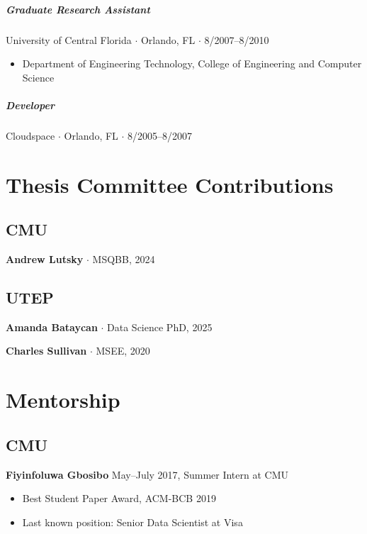\documentclass[10pt,letterpaper]{article}
\newcommand{\bigdot}{$\cdot$\xspace}
\begin{document}
\subparagraph{Graduate Research Assistant}
University of Central Florida \bigdot Orlando, FL \bigdot 8/2007--8/2010 
\begin{itemize}
    \item Department of Engineering Technology, College of Engineering and Computer Science
\end{itemize}

\subparagraph{Developer}
Cloudspace \bigdot Orlando, FL \bigdot 8/2005--8/2007 


\section*{Thesis Committee Contributions}
\subsection*{CMU}
\hspace{1.5em}\textbf{Andrew Lutsky} \bigdot MSQBB, 2024 

\subsection*{UTEP}
\hspace{1.5em}\textbf{Amanda Bataycan} \bigdot Data Science PhD, 2025

\textbf{Charles Sullivan} \bigdot MSEE, 2020

\section*{Mentorship}
\subsection*{CMU}
\hspace{1.5em}\textbf{Fiyinfoluwa Gbosibo} May--July 2017, Summer Intern at CMU
\begin{itemize}
\item Best Student Paper Award, ACM-BCB 2019
\item Last known position: Senior Data Scientist at Visa
\end{itemize}
\end{document}

